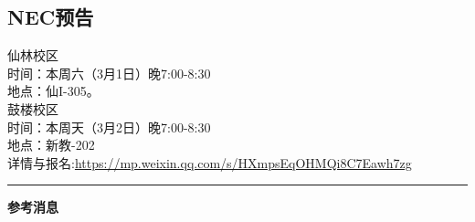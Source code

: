 \documentclass[letterpaper, 12pt]{article}
\begin{document}
\begin{multicols}{2}
\section{NEC预告}
仙林校区\\
时间：本周六（3月1日）晚7:00-8:30\\
地点：仙I-305。\\
鼓楼校区\\
时间：本周天（3月2日）晚7:00-8:30\\
地点：新教-202\\
详情与报名:\url{https://mp.weixin.qq.com/s/HXmpsEqOHMQi8C7Eawh7zg}\\




\end{multicols} 
\hrule
\vspace{4mm}
\centerline{\huge\textbf{参考消息}}
\end{document}
